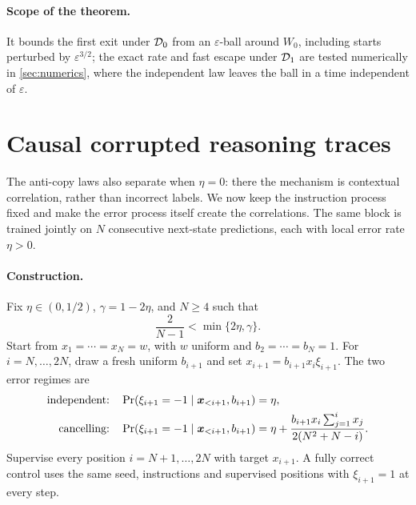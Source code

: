 \paragraph{Scope of the theorem.} It bounds the first exit under $\mathcal D_{0}$ from an $\varepsilon$-ball around $W_0$, including starts perturbed by $\varepsilon^{3/2}$;
the exact rate and fast escape under $\mathcal D_{1}$ are tested numerically in \cref{sec:numerics}, where the independent law leaves the ball in a time independent of $\varepsilon$.

\section{Causal corrupted reasoning traces}
\label{sec:causal}
The anti-copy laws also separate when $\eta=0$: there the mechanism is contextual correlation, rather than incorrect labels.
We now keep the instruction process fixed and make the error process itself create the correlations.
The same block is trained jointly on $N$ consecutive next-state predictions, each with local error rate $\eta>0$.

\paragraph{Construction.}
Fix $\eta\in(0,1/2)$, $\gamma=1-2\eta$, and $N\ge4$ such that
\[
 \frac{2}{N-1}<\min\{2\eta,\gamma\}.
\]
Start from $x_1=\cdots=x_N=w$, with $w$ uniform and $b_2=\cdots=b_N=1$.
For $i=N,\ldots,2N$, draw a fresh uniform $b_{i+1}$ and set $x_{i+1}=b_{i+1}x_i \xi_{i+1}$.
The two error regimes are
\begin{align}
 \text{independent:}\quad&\Pr(\xi_{i+1}=-1\mid\bm x_{<i+1},b_{i+1})=\eta,\notag\\
 \text{cancelling:}\quad&\Pr(\xi_{i+1}=-1\mid\bm x_{<i+1},b_{i+1})
 =\eta+\frac{b_{i+1}x_i\sum_{j=1}^i x_j}{2(N^2+N-i)}.
 \label{eq:causal-kernel}
\end{align}
Supervise every position $i=N+1,\ldots,2N$ with target $x_{i+1}$.
A fully correct control uses the same seed, instructions and supervised positions with $\xi_{i+1}=1$ at every step.

